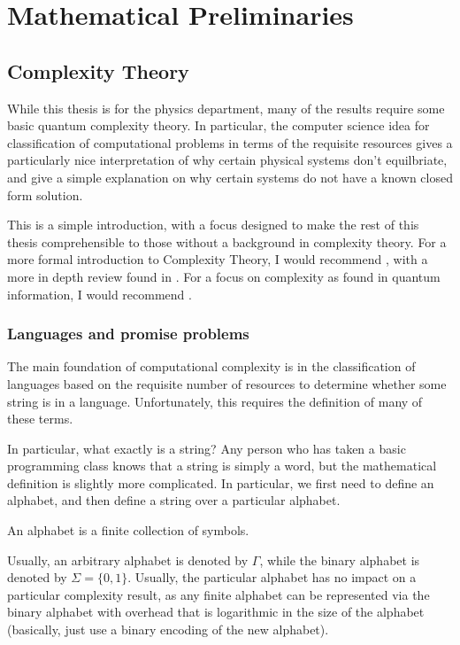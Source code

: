 \documentclass[../thesis-main/thesis-main]{subfiles}
\begin{document}
\chapter{Mathematical Preliminaries}

\section{Complexity Theory}

While this thesis is for the physics department, many of the results require some basic quantum complexity theory.  In particular, the computer science idea for classification of computational problems in terms of the requisite resources gives a particularly nice interpretation of why certain physical systems don't equilbriate, and give a simple explanation on why certain systems do not have a known closed form solution.

This is a simple introduction, with a focus designed to make the rest of this thesis comprehensible to those without a background in complexity theory.  For a more formal introduction to Complexity Theory, I would recommend \cite{SipserToC}, with a more in depth review found in \cite{ABCC}.  For a focus on complexity as found in quantum information, I would recommend \cite{Wat09}.

\subsection{Languages and promise problems}

The main foundation of computational complexity is in the classification of languages based on the requisite number of resources to determine whether some string is in a language.  Unfortunately, this requires the definition of many of these terms.  

In particular, what exactly is a string?  Any person who has taken a basic programming class knows that a string is simply a word, but the mathematical definition is slightly more complicated.  In particular, we first need to define an alphabet, and then define a string over a particular alphabet.  
\begin{definition}[Alphabet] An alphabet is a finite collection of symbols.
\end{definition}
Usually, an arbitrary alphabet is denoted by $\Gamma$, while the binary alphabet is denoted by $\Sigma = \{0,1\}$.  Usually, the particular alphabet has no impact on a particular complexity result, as any finite alphabet can be represented via the binary alphabet with overhead that is logarithmic in the size of the alphabet (basically, just use a binary encoding of the new alphabet).  
\end{document}

